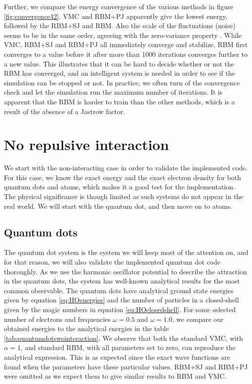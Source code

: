 Further, we compare the energy convergence of the various methods in figure \eqref{fig:convergence42}. VMC and RBM+PJ apparently give the lowest energy, followed by the RBM+SJ and RBM. Also the scale of the fluctuations (noise) seems to be in the same order, agreeing with the zero-variance property \cite{giuseppe_carleo_neural-network_2017}. While VMC, RBM+SJ and RBM+PJ all immediately converge and stabilize, RBM first converges to a value before it after more than 1000 iterations converges further to a new value. This illustrates that it can be hard to decide whether or not the RBM has converged, and an intelligent system is needed in order to see if the simulation can be stopped or not. In practice, we often turn of the convergence check and let the simulation run the maximum number of iterations. It is apparent that the RBM is harder to train than the other methods, which is a result of the absence of a Jastrow factor.

\section{No repulsive interaction} \label{sec:norepulsive}
We start with the non-interacting case in order to validate the implemented code. For this case, we know the exact energy and the exact electron density for both quantum dots and atoms, which makes it a good test for the implementation. The physical significance is though limited as such systems do not appear in the real world. We will start with the quantum dot, and then move on to atoms. 

\subsection{Quantum dots}
The quantum dot system is the system we will keep most of the attention on, and for that reason, we will also validate the implemented quantum dot code thoroughly. As we use the harmonic oscillator potential to describe the attraction in the quantum dots, the system has well-known analytical results for the most common observable. The quantum dots have analytical ground state energies given by equation \eqref{eq:HOenergies} and the number of particles in a closed-shell given by the magic numbers in equation \eqref{eq:HOclosedshell}. For some selected number of electrons and frequencies $\omega=0.5$ and $\omega=1.0$, we compare our obtained energies to the analytical energies in the table \eqref{tab:quantumdotswointeraction}. We observe that both the standard VMC, with $\alpha=1$, and standard RBM, with all parameters set to zero, can reproduce the analytical expression. This is as expected since the exact wave functions are found when the parameters have these particular values. RBM+SJ and RBM+PJ were omitted as we expect them to give similar results to RBM and VMC.

